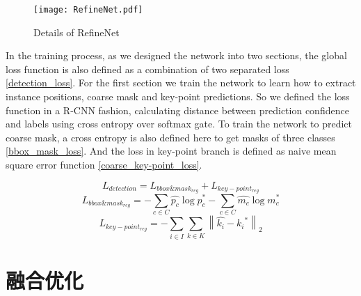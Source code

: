 \begin{figure*}[htbp]
	\centering
	\texttt{[image: RefineNet.pdf]}
	\caption{Details of RefineNet}
	\label{fig:RefineNet}
\end{figure*}

In the training process, as we designed the network into two sections, the global loss function is also defined as a combination of two separated loss \eqref{detection_loss}. For the first section we train the network to learn how to extract instance positions, coarse mask and key-point predictions. So we defined the loss function in a R-CNN fashion, calculating distance between prediction confidence and labels using cross entropy over softmax gate. To train the network to predict coarse mask, a cross entropy is also defined here to get masks of three classes \eqref{bbox_mask_loss}. And the loss in key-point branch is defined as naive mean square error function \eqref{coarse_key-point_loss}.

\begin{equation}
\label{detection_loss}
L_{detection} = L_{bbox\&mask_{reg}} + L_{key-point_{reg}}
\end{equation}      
\begin{equation}
\label{bbox_mask_loss}
L_{bbox\&mask_{reg}} = -\sum_{c \in C}{\hat{p_c} \log{p_c^{*}}}  -\sum_{c \in C}{\hat{m_c} \log{m_c^{*}}}
\end{equation}
\begin{equation}
\label{coarse_key-point_loss}
L_{key-point_{reg}} = -\sum_{i \in I}\sum_{k \in K}{\left\| \hat{k_i} - {k_i}^{*} \right\|_2}
\end{equation}


\section{融合优化}
\label{sec:refine}
